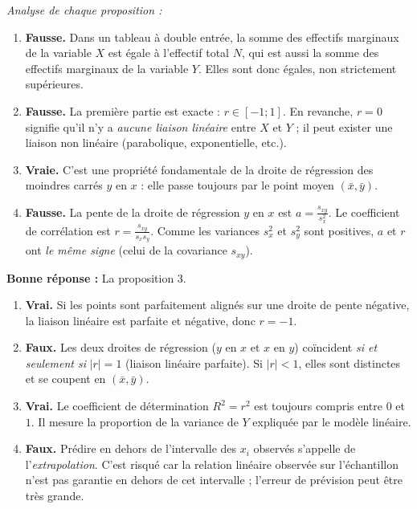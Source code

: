\documentclass[11pt]{article}
\begin{document}
\begin{corrige}
\emph{Analyse de chaque proposition :}

\begin{enumerate}
\item \textbf{Fausse.} Dans un tableau à double entrée, la somme des effectifs marginaux de la variable $X$ est égale à l'effectif total $N$, qui est aussi la somme des effectifs marginaux de la variable $Y$. Elles sont donc égales, non strictement supérieures.
\item \textbf{Fausse.} La première partie est exacte : $r \in [-1; 1]$. En revanche, $r = 0$ signifie qu'il n'y a \emph{aucune liaison linéaire} entre $X$ et $Y$ ; il peut exister une liaison non linéaire (parabolique, exponentielle, etc.).
\item \textbf{Vraie.} C'est une propriété fondamentale de la droite de régression des moindres carrés $y$ en $x$ : elle passe toujours par le point moyen $(\bar{x}, \bar{y})$.
\item \textbf{Fausse.} La pente de la droite de régression $y$ en $x$ est $a = \frac{s_{xy}}{s_x^2}$. Le coefficient de corrélation est $r = \frac{s_{xy}}{s_x s_y}$. Comme les variances $s_x^2$ et $s_y^2$ sont positives, $a$ et $r$ ont \emph{le même signe} (celui de la covariance $s_{xy}$).
\end{enumerate}
\textbf{Bonne réponse :} La proposition 3.
\end{corrige}

\begin{corrige}
\begin{enumerate}
\item \textbf{Vrai.} Si les points sont parfaitement alignés sur une droite de pente négative, la liaison linéaire est parfaite et négative, donc $r = -1$.
\item \textbf{Faux.} Les deux droites de régression ($y$ en $x$ et $x$ en $y$) coïncident \emph{si et seulement si} $|r| = 1$ (liaison linéaire parfaite). Si $|r| < 1$, elles sont distinctes et se coupent en $(\bar{x}, \bar{y})$.
\item \textbf{Vrai.} Le coefficient de détermination $R^2 = r^2$ est toujours compris entre $0$ et $1$. Il mesure la proportion de la variance de $Y$ expliquée par le modèle linéaire.
\item \textbf{Faux.} Prédire en dehors de l'intervalle des $x_i$ observés s'appelle de l'\emph{extrapolation}. C'est risqué car la relation linéaire observée sur l'échantillon n'est pas garantie en dehors de cet intervalle ; l'erreur de prévision peut être très grande.
\end{enumerate}
\end{corrige}
\end{document}
